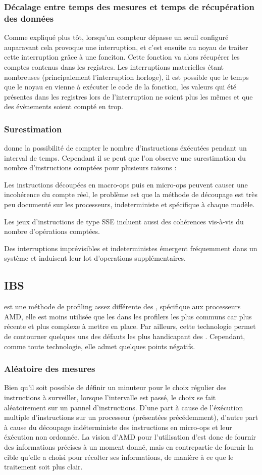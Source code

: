 					\subsubsection{Décalage entre temps des mesures et temps de récupération des données}
						Comme expliqué plus tôt, lorsqu'un compteur dépasse un seuil configuré auparavant cela provoque une interruption, et c'est ensuite au noyau de traiter cette interruption grâce à une fonciton. Cette fonction va alors récupérer les comptes contenus dans les registres. Les interruptions materielles étant nombreuses (principalement l'interruption horloge), il est possible que le temps que le noyau en vienne à exécuter le code de la fonction, les valeurs qui été présentes dans les registres lors de l'interruption ne soient plus les mêmes et que des évènements soient compté en trop.
					\subsubsection{Surestimation}
						\PMC donne la possibilité de compter le nombre d'instructions éxécutées pendant un interval de temps. Cependant il se peut que l'on observe une surestimation du nombre d'instructions comptées pour plusieurs raisons : 
						\bitem
							\item{Les instructions découpées en macro-ops puis en micro-ops peuvent causer une incohérence du compte réel, le problème est que la méthode de découpage est très peu documenté sur les processeurs, indeterministe et spécifique à chaque modèle.}
							\item{Les jeux d'instructions de type SSE incluent aussi des cohérences vis-à-vis du nombre d'opérations comptées.}
							\item{Des interruptions imprévisibles et indeterministes émergent fréquemment dans un système et induisent leur lot d'operations supplémentaires.}
						\eitem
				\subsection{IBS}
					\IBS est une méthode de profiling assez différente des \PMC, spécifique aux processeurs AMD, elle est moins utilisée que les \PMC dans les profilers les plus communs car plus récente et plus complexe à mettre en place. Par ailleurs, cette technologie permet de contourner quelques uns des défauts les plus handicapant des \PMC. Cependant, comme toute technologie, elle admet quelques points négatifs.
					\subsubsection{Aléatoire des mesures}
						Bien qu'il soit possible de définir un minuteur pour le choix régulier des instructions à surveiller, lorsque l'intervalle est passé, le choix se fait aléatoirement sur un pannel d'instructions. D'une part à cause de l'éxécution multiple d'instructions sur un processeur (présentées précédemment), d'autre part à cause du découpage indéterministe des instructions en micro-ops et leur éxécution non ordonnée. La vision d'AMD pour l'utilisation d'\IBS est donc de fournir des informations précises à un moment donné, mais en contrepartie de fournir la cible qu'elle a choisi pour récolter ses informations, de manière à ce que le traitement soit plus clair.
